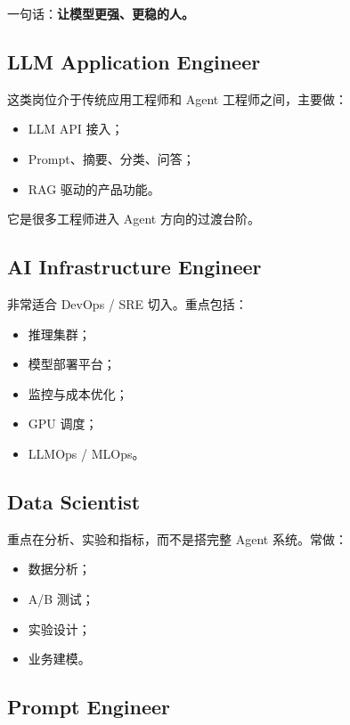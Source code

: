 一句话：\textbf{让模型更强、更稳的人。}


\subsection{LLM Application Engineer}

这类岗位介于传统应用工程师和 Agent 工程师之间，主要做：


\begin{itemize}[leftmargin=2em]
\item LLM API 接入；
\item Prompt、摘要、分类、问答；
\item RAG 驱动的产品功能。
\end{itemize}

它是很多工程师进入 Agent 方向的过渡台阶。


\subsection{AI Infrastructure Engineer}

非常适合 DevOps / SRE 切入。重点包括：


\begin{itemize}[leftmargin=2em]
\item 推理集群；
\item 模型部署平台；
\item 监控与成本优化；
\item GPU 调度；
\item LLMOps / MLOps。
\end{itemize}

\subsection{Data Scientist}

重点在分析、实验和指标，而不是搭完整 Agent 系统。常做：


\begin{itemize}[leftmargin=2em]
\item 数据分析；
\item A/B 测试；
\item 实验设计；
\item 业务建模。
\end{itemize}

\subsection{Prompt Engineer}

